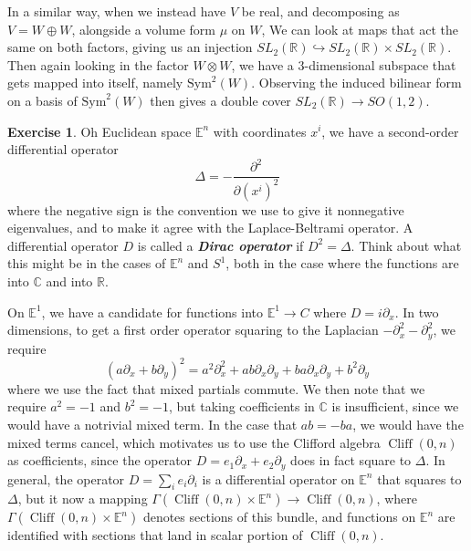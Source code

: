 \documentclass[psamsfonts]{amsart}
\theoremstyle{definition}
\newtheorem{exer}[thm]{Exercise}
\theoremstyle{remark}
\newcommand{\R}{\mathbb{R}}
\newcommand{\ib}[1]{\textbf{\textit{#1}}}
\newcommand{\E}{\mathbb{E}}
\newcommand{\C}{\mathbb{C}}
\DeclareMathOperator{\Cliff}{Cliff}
\begin{document}
In a similar way, when we instead have $V$ be real, and decomposing as $V = W \oplus W$, alongside a volume form $\mu$ on $W$, We can look at maps that act the same on both factors, giving us an injection $SL_2(\R) \hookrightarrow SL_2(\R) \times SL_2(\R)$. Then again looking in the factor $W \otimes W$, we have a $3$-dimensional subspace that gets mapped into itself, namely $\mathrm{Sym}^2(W)$. Observing the induced bilinear form on a basis of $\mathrm{Sym}^2(W)$ then gives a double cover $SL_2(\R) \to SO(1,2)$.
%
\begin{exer}
Oh Euclidean space $\mathbb{E}^n$ with coordinates $x^i$, we have a second-order differential operator 
$$\Delta = -\frac{\partial^2}{\partial(x^i)^2} $$
where the negative sign is the convention we use to give it nonnegative eigenvalues, and to make it agree with the Laplace-Beltrami operator. A differential operator $D$ is called a \ib{Dirac operator} if $D^2 = \Delta$. Think about what this might be in the cases of $\mathbb{E}^n$ and $S^1$, both in the case where the functions are into $\C$ and into $\R$.
\end{exer}
On $\E^1$, we have a candidate for functions into $\E^1 \to C$ where $D = i\partial_x$. In two dimensions, to get a first order operator squaring to the Laplacian $-\partial_x^2 - \partial_y^2$, we require
$$(a\partial_x + b\partial_y)^2 = a^2\partial_x^2 + ab\partial_x\partial_y + ba\partial_x\partial_y + b^2\partial_y $$
where we use the fact that mixed partials commute. We then note that we require $a^2 = -1$ and $b^2 = -1$, but taking coefficients in $\C$ is insufficient, since we would have a notrivial mixed term. In the case that $ab = -ba$, we would have the mixed terms cancel, which motivates us to use the Clifford algebra $\Cliff(0,n)$ as coefficients, since the operator $D = e_1\partial_x + e_2\partial_y$ does in fact square to $\Delta$. In general, the operator $D = \sum_i e_i\partial_i$ is a differential operator on $\E^n$ that squares to $\Delta$, but it now a mapping $\Gamma(\Cliff(0,n) \times \E^n ) \to \Cliff(0,n)$, where $\Gamma(\Cliff(0,n) \times \E^n )$ denotes sections of this bundle, and functions on $\E^n$ are identified with sections that land in scalar portion of $\Cliff(0,n)$. 
\end{document}

